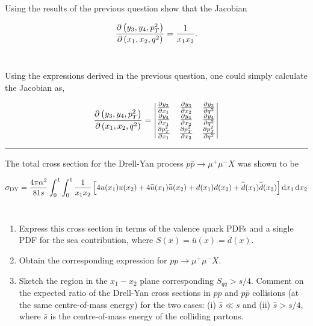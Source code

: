 \begin{problem}{10.7}
Using the results of the previous question show that the Jacobian

    \begin{align*}
        \frac{\partial \left( y_3,y_4,p_T^2 \right)}{\partial \left( x_1, x_2, q^2 \right)} = \frac{1}{x_1x_2}.
    \end{align*}\\
\end{problem}
\begin{solution}
Using the expressions derived in the previous question, one could simply calculate the Jacobian as,

    \begin{align*}
        \frac{\partial \left( y_3,y_4,p_T^2 \right)}{\partial \left( x_1, x_2, q^2 \right)} = 
        \begin{vmatrix}
            \frac{\partial y_3}{\partial x_1} & \frac{\partial y_3}{\partial x_2} & \frac{\partial y_3}{\partial q^2}\\ 
            \frac{\partial y_4}{\partial x_1} & \frac{\partial y_4}{\partial x_2} & \frac{\partial y_4}{\partial q^2}\\ 
            \frac{\partial p_T^2}{\partial x_1} & \frac{\partial p_T^2}{\partial x_2} & \frac{\partial p_T^2}{\partial q^2}
       \end{vmatrix}
    \end{align*}
\end{solution}

\noindent\rule{7in}{1.5pt}


\begin{problem}{10.8}
The total cross section for the Drell-Yan process $p\overbar{p}\to \mu^+\mu^-X$ was shown to be

\begin{align*}
    \sigma_\text{DY} = \frac{4\pi \alpha^2}{81s} \int_0^1 \int_0^1 \frac{1}{x_1x_2} \left[ 4u(x_1)u(x_2) + 4 \overbar{u}(x_1)\overbar{u}(x_2) + d(x_1) d(x_2) + \overbar{d}(x_1)\overbar{d}(x_2)  \right] \dif x_1 \dif x_2
\end{align*}\\
\begin{enumerate}[label=(\alph*)]
    \item Express this cross section in terms of the valence quark PDFs and a single PDF for the sea contribution, where $S(x)=\overbar{u}(x) = \overbar{d}(x)$.
    \item Obtain the corresponding expression for $pp\to\mu^+\mu^-X$.
    \item Sketch the region in the $ x_1-x_2$ plane corresponding $S_{q\overbar{q}}>s/4$. Comment on the expected ratio of the Drell-Yan cross sections in $pp$ and $p\overbar{p}$ collisions (at the same centre-of-mass energy) for the two cases: (i) $\hat{s} \ll s$ and (ii) $\hat{s} > s/4$, where $\hat{s}$ is the centre-of-mass energy of the colliding partons.
\end{enumerate}
\end{problem}
\begin{solution}

\end{solution}

